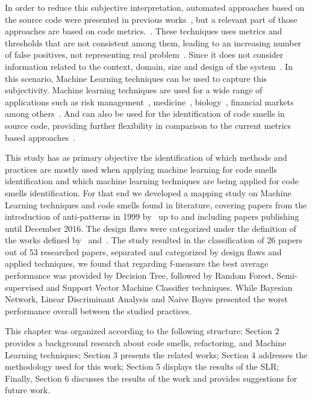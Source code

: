 In order to reduce this subjective interpretation, automated approaches based on the source code were presented in previous works~\citep{fontana2012automatic, fokaefs2007jdeodorant, mantyla2004bad, rasool2015review}, but a relevant part of those approaches are based on code metrics.~\citep{bryton2010reducing, counsell2010strategy, marinescu2004detection, moha2010decor, rasool2015review}. These techniques uses metrics and thresholds that are not consistent among them, leading to an increasing number of false positives, not representing real problem~\citep{fontana2016comparing}. Since it does not consider information related to the context, domain, size and design of the system~\citep{ferme2013real}. In this scenario, Machine Learning techniques can be used to capture this subjectivity. Machine learning techniques are used for a wide range of applications such as risk management~\citep{cowell2007modeling}, medicine~\citep{akay2009support}, biology~\citep{kell2006metabolomics}, financial markets~\citep{doostmohammadi2017day} among others~\citep{fenton2007managing, li2017deep}. And can also be used for the identification of code smells in source code, providing further flexibility in comparison to the current metrics based approaches~\citep{kotsiantis2007supervised}.

This study has as primary objective the identification of which methods and practices are mostly used when applying machine learning for code smells identification and which machine learning techniques are being applied for code smells identification. For that end we developed a mapping study on Machine Learning techniques and code smells found in literature, covering papers from the introduction of anti-patterns in 1999 by~\cite{fowler1999refactoring} up to and including papers publishing until December 2016.  The design flaws were categorized under the definition of the works defined by~\cite{fowler1999refactoring} and~\cite{brown1998antipatterns}. The study resulted in the classification of 26 papers out of 53 researched papers, separated and categorized by design flaws and applied techniques, we found that regarding f-measure the best average performance was provided by Decision Tree, followed by Random Forest, Semi-supervised and Support Vector Machine Classifier techniques. While Bayesian Network, Linear Discriminant Analysis and Naive Bayes presented the worst performance overall between the studied practices. 

This chapter was organized according to the following structure:  Section 2 provides a background research about code smells, refactoring, and Machine Learning techniques; Section 3 presents the related works; Section 4 addresses the methodology used for this work; Section 5 displays the results of the SLR; Finally, Section 6 discusses the results of the work and provides suggestions for future work.


